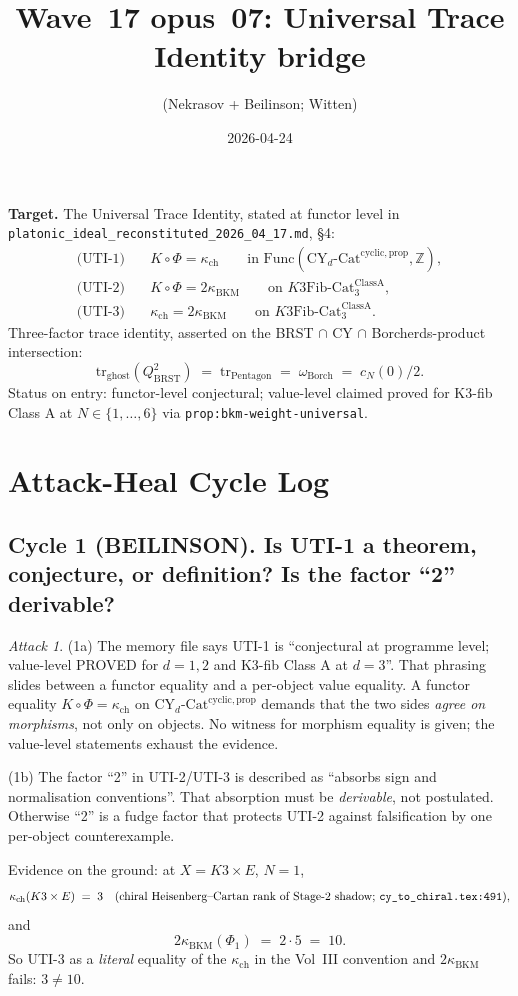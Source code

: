 \documentclass[11pt]{amsart}
\title{Wave~17 opus~07: Universal Trace Identity bridge}
\author{(Nekrasov + Beilinson; Witten)}
\date{2026-04-24}
\theoremstyle{definition}
\theoremstyle{remark}
\newtheorem{attack}[theorem]{Attack}
\newcommand{\CY}{\mathrm{CY}}
\newcommand{\Cat}{\mathrm{Cat}}
\newcommand{\kch}{\kappa_{\mathrm{ch}}}
\newcommand{\kBKM}{\kappa_{\mathrm{BKM}}}
\newcommand{\Borch}{\mathrm{Borch}}
\newcommand{\BRST}{\mathrm{BRST}}
\begin{document}
\maketitle

\noindent \textbf{Target.} The Universal Trace Identity, stated at functor level in
\texttt{platonic\_ideal\_reconstituted\_2026\_04\_17.md}, \S4:
\begin{align}
\text{(UTI-1)} & \quad K \circ \Phi = \kch \qquad \text{in } \mathrm{Func}(\CY_d\text{-}\Cat^{\mathrm{cyclic,prop}}, \mathbb{Z}), \\
\text{(UTI-2)} & \quad K \circ \Phi = 2 \kBKM \qquad \text{on } K3\mathrm{Fib}\text{-}\Cat_3^{\mathrm{ClassA}}, \\
\text{(UTI-3)} & \quad \kch = 2 \kBKM \qquad \text{on } K3\mathrm{Fib}\text{-}\Cat_3^{\mathrm{ClassA}}.
\end{align}
Three-factor trace identity, asserted on the BRST $\cap$ CY $\cap$ Borcherds-product intersection:
\[
\mathrm{tr}_{\mathrm{ghost}}(Q_{\BRST}^2) \;=\; \mathrm{tr}_{\mathrm{Pentagon}} \;=\; \omega_{\Borch} \;=\; c_N(0)/2.
\]
Status on entry: functor-level conjectural; value-level claimed proved for K3-fib Class A at
$N \in \{1, \ldots, 6\}$ via \texttt{prop:bkm-weight-universal}.

\section{Attack-Heal Cycle Log}

\subsection{Cycle 1 (BEILINSON). Is UTI-1 a theorem, conjecture, or definition? Is the factor
``2'' derivable?}

\begin{attack}
(1a) The memory file says UTI-1 is ``conjectural at programme level; value-level PROVED for $d=1,2$
and K3-fib Class A at $d=3$''. That phrasing slides between a functor equality and a per-object
value equality. A functor equality $K \circ \Phi = \kch$ on $\CY_d$-$\Cat^{\mathrm{cyclic,prop}}$
demands that the two sides \emph{agree on morphisms}, not only on objects. No witness for morphism
equality is given; the value-level statements exhaust the evidence.

(1b) The factor ``2'' in UTI-2/UTI-3 is described as ``absorbs sign and normalisation conventions''.
That absorption must be \emph{derivable}, not postulated. Otherwise ``2'' is a fudge factor that
protects UTI-2 against falsification by one per-object counterexample.

Evidence on the ground: at $X = K3 \times E$, $N=1$,
\[
\kch(K3 \times E) \;=\; 3 \quad \text{(chiral Heisenberg--Cartan rank of Stage-2 shadow;
\texttt{cy\_to\_chiral.tex:491})},
\]
and
\[
2 \kBKM(\Phi_1) \;=\; 2 \cdot 5 \;=\; 10.
\]
So UTI-3 as a \emph{literal} equality of the $\kch$ in the Vol~III convention and $2\kBKM$ fails:
$3 \neq 10$.
\end{attack}
\end{document}
